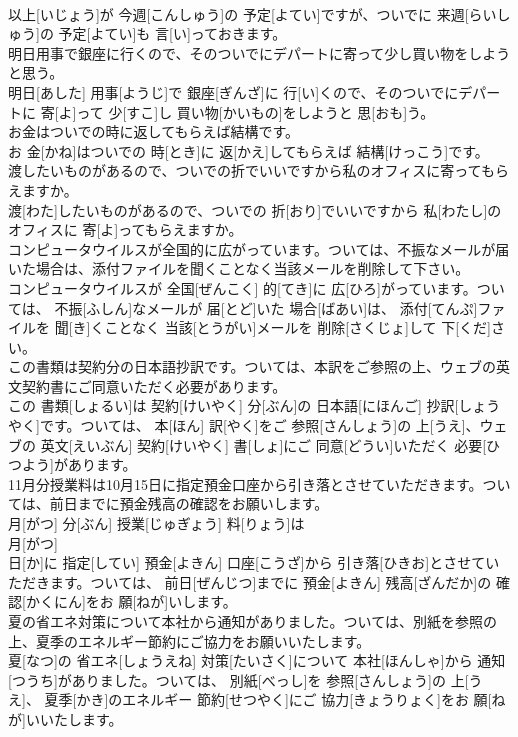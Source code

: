 \documentclass[8pt]{extreport}
\begin{document}
\begin{CJK}{UTF8}{min}
\\	以上[いじょう]が 今週[こんしゅう]の 予定[よてい]ですが、ついでに 来週[らいしゅう]の 予定[よてい]も 言[い]っておきます。
\\	明日用事で銀座に行くので、そのついでにデパートに寄って少し買い物をしようと思う。	
\\	明日[あした] 用事[ようじ]で 銀座[ぎんざ]に 行[い]くので、そのついでにデパートに 寄[よ]って 少[すこ]し 買い物[かいもの]をしようと 思[おも]う。
\\	お金はついでの時に返してもらえば結構です。	
\\	お 金[かね]はついでの 時[とき]に 返[かえ]してもらえば 結構[けっこう]です。
\\	渡したいものがあるので、ついでの折でいいですから私のオフィスに寄ってもらえますか。	
\\	渡[わた]したいものがあるので、ついでの 折[おり]でいいですから 私[わたし]のオフィスに 寄[よ]ってもらえますか。
\\	コンピュータウイルスが全国的に広がっています。ついては、不振なメールが届いた場合は、添付ファイルを聞くことなく当該メールを削除して下さい。	
\\	コンピュータウイルスが 全国[ぜんこく] 的[てき]に 広[ひろ]がっています。ついては、 不振[ふしん]なメールが 届[とど]いた 場合[ばあい]は、 添付[てんぷ]ファイルを 聞[き]くことなく 当該[とうがい]メールを 削除[さくじょ]して 下[くだ]さい。
\\	この書類は契約分の日本語抄訳です。ついては、本訳をご参照の上、ウェブの英文契約書にご同意いただく必要があります。	
\\	この 書類[しょるい]は 契約[けいやく] 分[ぶん]の 日本語[にほんご] 抄訳[しょうやく]です。ついては、 本[ほん] 訳[やく]をご 参照[さんしょう]の 上[うえ]、ウェブの 英文[えいぶん] 契約[けいやく] 書[しょ]にご 同意[どうい]いただく 必要[ひつよう]があります。
\\	11月分授業料は10月15日に指定預金口座から引き落とさせていただきます。ついては、前日までに預金残高の確認をお願いします。	
\\	月[がつ] 分[ぶん] 授業[じゅぎょう] 料[りょう]は 
\\	月[がつ] 
\\	日[か]に 指定[してい] 預金[よきん] 口座[こうざ]から 引き落[ひきお]とさせていただきます。ついては、 前日[ぜんじつ]までに 預金[よきん] 残高[ざんだか]の 確認[かくにん]をお 願[ねが]いします。
\\	夏の省エネ対策について本社から通知がありました。ついては、別紙を参照の上、夏季のエネルギー節約にご協力をお願いいたします。	
\\	夏[なつ]の 省エネ[しょうえね] 対策[たいさく]について 本社[ほんしゃ]から 通知[つうち]がありました。ついては、 別紙[べっし]を 参照[さんしょう]の 上[うえ]、 夏季[かき]のエネルギー 節約[せつやく]にご 協力[きょうりょく]をお 願[ねが]いいたします。

\end{CJK}
\end{document}
